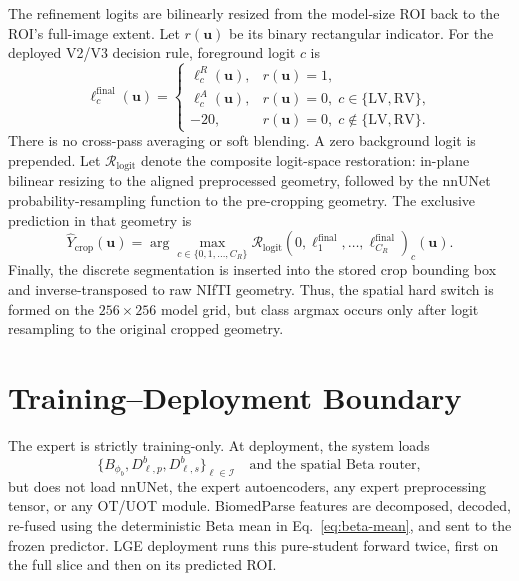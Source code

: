 \documentclass[10pt]{article}
\begin{document}
The refinement logits are bilinearly resized from the model-size ROI back to the
ROI's full-image extent.  Let $r(\bm{u})$ be its binary rectangular indicator.
For the deployed V2/V3 decision rule, foreground logit $c$ is
\begin{equation}
    \ell^{\mathrm{final}}_c(\bm{u})=
    \begin{cases}
      \ell^{R}_c(\bm{u}),&r(\bm{u})=1,\\
      \ell^{A}_c(\bm{u}),&r(\bm{u})=0,
          \;c\in\{\mathrm{LV},\mathrm{RV}\},\\
      -20,&r(\bm{u})=0,
          \;c\notin\{\mathrm{LV},\mathrm{RV}\}.
    \end{cases}
    \label{eq:hard-switch}
\end{equation}
There is no cross-pass averaging or soft blending.  A zero background logit is
prepended.  Let $\mathcal{R}_{\mathrm{logit}}$ denote the composite logit-space
restoration: in-plane bilinear resizing to the aligned preprocessed geometry,
followed by the nnUNet probability-resampling function to the
pre-cropping geometry.  The exclusive prediction in that geometry is
\begin{equation}
    \widehat Y_{\mathrm{crop}}(\bm{u})
    =\arg\max_{c\in\{0,1,\ldots,C_R\}}
       \mathcal{R}_{\mathrm{logit}}\!\left(
       0,\ell^{\mathrm{final}}_1,\ldots,
       \ell^{\mathrm{final}}_{C_R}\right)_c(\bm{u}).
    \label{eq:exclusive-prediction}
\end{equation}
Finally, the discrete segmentation is inserted into the stored crop bounding box
and inverse-transposed to raw NIfTI geometry.  Thus, the spatial hard switch is
formed on the $256\times256$ model grid, but class argmax occurs only after logit
resampling to the original cropped geometry.

\section{Training--Deployment Boundary}


The expert is strictly training-only.  At deployment, the system loads
\begin{equation}
    \{B_{\phi_b},D^b_{\ell,p},D^b_{\ell,s}\}_{\ell\in\mathcal{I}}
    \quad\text{and the spatial Beta router},
\end{equation}
but does not load nnUNet, the expert autoencoders, any expert preprocessing
tensor, or any OT/UOT module.  BiomedParse features are decomposed, decoded,
re-fused using the deterministic Beta mean in Eq.~\eqref{eq:beta-mean}, and sent
to the frozen predictor.  LGE deployment runs this pure-student forward twice,
first on the full slice and then on its predicted ROI.
\end{document}
